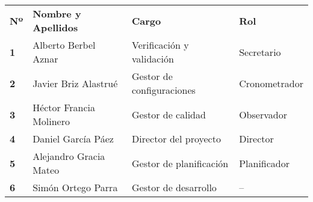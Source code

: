\begin{longtable}{ | C{\tabcolsep} |
                     L{\tabcolsep} |
                     C{\tabcolsep} |
                     C{\tabcolsep} | }
\hline %
 \\
\hline %
{\bf Nº} & {\bf Nombre y Apellidos} & {\bf Cargo} & {\bf Rol} \\
\hline %
{\bf 1} & Alberto Berbel Aznar & Verificación y validación & Secretario  \\
\hline %
{\bf 2} & Javier Briz Alastrué & Gestor de configuraciones & Cronometrador  \\
\hline %
{\bf 3} & Héctor Francia Molinero & Gestor de calidad & Observador  \\
\hline %
{\bf 4} & Daniel García Páez & Director del proyecto & Director \\
\hline %
{\bf 5} & Alejandro Gracia Mateo & Gestor de planificación & Planificador \\
\hline %
{\bf 6} & Simón Ortego Parra & Gestor de desarrollo & --  \\
\hline %
\end{longtable}


